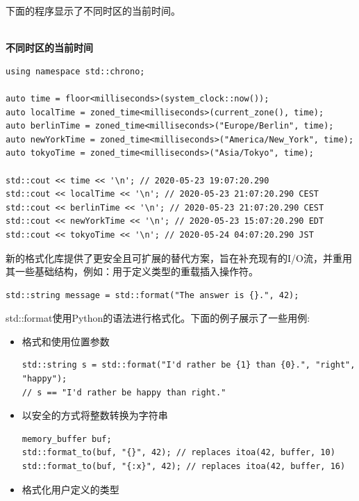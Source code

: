 下面的程序显示了不同时区的当前时间。

\hspace*{\fill} \\ %
\noindent
\textbf{不同时区的当前时间}
\begin{lstlisting}[style=styleCXX]
using namespace std::chrono;

auto time = floor<milliseconds>(system_clock::now());
auto localTime = zoned_time<milliseconds>(current_zone(), time);
auto berlinTime = zoned_time<milliseconds>("Europe/Berlin", time);
auto newYorkTime = zoned_time<milliseconds>("America/New_York", time);
auto tokyoTime = zoned_time<milliseconds>("Asia/Tokyo", time);

std::cout << time << '\n'; // 2020-05-23 19:07:20.290
std::cout << localTime << '\n'; // 2020-05-23 21:07:20.290 CEST
std::cout << berlinTime << '\n'; // 2020-05-23 21:07:20.290 CEST
std::cout << newYorkTime << '\n'; // 2020-05-23 15:07:20.290 EDT
std::cout << tokyoTime << '\n'; // 2020-05-24 04:07:20.290 JST
\end{lstlisting}


新的格式化库提供了更安全且可扩展的替代方案，旨在补充现有的I/O流，并重用其一些基础结构，例如：用于定义类型的重载插入操作符。

\begin{lstlisting}[style=styleCXX]
std::string message = std::format("The answer is {}.", 42);
\end{lstlisting}

std::format使用Python的语法进行格式化。下面的例子展示了一些用例:

\begin{itemize}
\item 
格式和使用位置参数

\begin{lstlisting}[style=styleCXX]
std::string s = std::format("I'd rather be {1} than {0}.", "right", "happy");
// s == "I'd rather be happy than right."
\end{lstlisting}

\item 
以安全的方式将整数转换为字符串

\begin{lstlisting}[style=styleCXX]
memory_buffer buf;
std::format_to(buf, "{}", 42); // replaces itoa(42, buffer, 10)
std::format_to(buf, "{:x}", 42); // replaces itoa(42, buffer, 16)
\end{lstlisting}

\item 
格式化用户定义的类型

\end{itemize}

